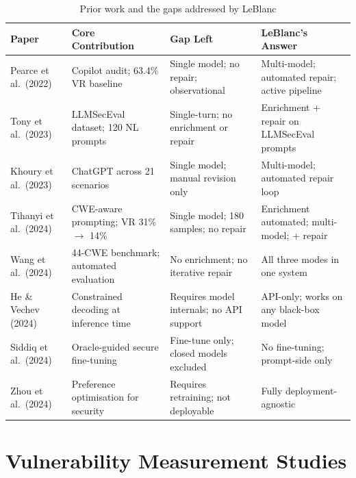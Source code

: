 \documentclass[12pt,a4paper]{report}
\begin{document}
\begin{table}[H]
\centering
\caption{Prior work and the gaps addressed by LeBlanc}
\label{tab:litgap}
\small
\renewcommand{\arraystretch}{1.3}
\begin{tabularx}{\textwidth}{@{}p{1.6in}p{1.5in}p{1.5in}p{1.5in}@{}}
\toprule
\textbf{Paper} & \textbf{Core Contribution} & \textbf{Gap Left} & \textbf{LeBlanc's Answer} \\
\midrule
Pearce et al.\ (2022) \cite{pearce2022asleep}
  & Copilot audit; 63.4\% VR baseline
  & Single model; no repair; observational
  & Multi-model; automated repair; active pipeline \\

Tony et al.\ (2023) \cite{tony2023llmseceval}
  & LLMSecEval dataset; 120 NL prompts
  & Single-turn; no enrichment or repair
  & Enrichment + repair on LLMSecEval prompts \\

Khoury et al.\ (2023) \cite{khoury2023secure}
  & ChatGPT across 21 scenarios
  & Single model; manual revision only
  & Multi-model; automated repair loop \\

Tihanyi et al.\ (2024) \cite{tihanyi2023secucogenicse}
  & CWE-aware prompting; VR 31\% $\to$ 14\%
  & Single model; 180 samples; no repair
  & Enrichment automated; multi-model; + repair \\

Wang et al.\ (2024) \cite{codeseceval2023}
  & 44-CWE benchmark; automated evaluation
  & No enrichment; no iterative repair
  & All three modes in one system \\

He \& Vechev (2024) \cite{codeguard2024}
  & Constrained decoding at inference time
  & Requires model internals; no API support
  & API-only; works on any black-box model \\

Siddiq et al.\ (2024) \cite{hexacoder2024}
  & Oracle-guided secure fine-tuning
  & Fine-tune only; closed models excluded
  & No fine-tuning; prompt-side only \\

Zhou et al.\ (2024) \cite{lpo2024}
  & Preference optimisation for security
  & Requires retraining; not deployable
  & Fully deployment-agnostic \\
\bottomrule
\end{tabularx}
\end{table}

\section{Vulnerability Measurement Studies}
\label{sec:litbaseline}
\end{document}
